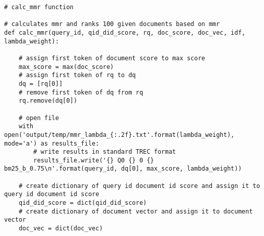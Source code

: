 \documentclass{article} %
\begin{document}
\begin{lstlisting}[style=Python]
# calc_mmr function

# calculates mmr and ranks 100 given documents based on mmr
def calc_mmr(query_id, qid_did_score, rq, doc_score, doc_vec, idf, lambda_weight):

    # assign first token of document score to max score
    max_score = max(doc_score)
    # assign first token of rq to dq
    dq = [rq[0]]
    # remove first token of dq from rq
    rq.remove(dq[0])

    # open file
    with open('output/temp/mmr_lambda_{:.2f}.txt'.format(lambda_weight), mode='a') as results_file:
        # write results in standard TREC format
        results_file.write('{} Q0 {} 0 {} bm25_b_0.75\n'.format(query_id, dq[0], max_score, lambda_weight))

    # create dictionary of query id document id score and assign it to query id document id score
    qid_did_score = dict(qid_did_score)
    # create dictionary of document vector and assign it to document vector
    doc_vec = dict(doc_vec)


\end{lstlisting}
\end{document}
